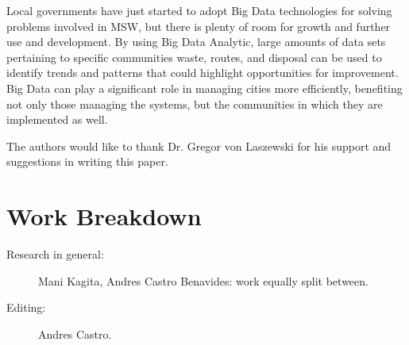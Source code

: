 \documentclass[sigconf]{acmart}
\begin{document}
Local governments have just started to adopt Big Data technologies for solving problems involved in MSW, but there is plenty of room for growth and further use and development.  By using Big Data Analytic, large amounts of data sets pertaining to specific communities waste, routes, and disposal can be used to identify trends and patterns that could highlight opportunities for improvement. Big Data can play a significant role in managing cities more efficiently, benefiting not only those managing the systems, but the communities in which they are implemented as well.
\begin{acks}

The authors would like to thank Dr. Gregor von Laszewski for his support and suggestions in writing this paper.

\end{acks}

 

\newpage

\appendix

\section{Work Breakdown}

\begin{description}

\item[Research in general:] Mani Kagita, Andres Castro Benavides: work equally split between.

\item[Editing:] Andres Castro.

\end{description}
\end{document}
